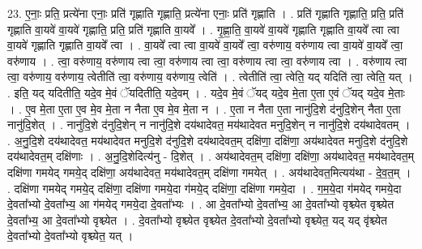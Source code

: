 \documentclass[17pt]{extarticle}
\begin{document}
23. ए॒नाः॒ प्रति॒ प्रत्ये॑ना एनाः॒ प्रति॑ गृह्णाति गृह्णाति॒ प्रत्ये॑ना एनाः॒ प्रति॑ गृह्णाति । . प्रति॑ गृह्णाति गृह्णाति॒ प्रति॒ प्रति॑ गृह्णाति वा॒यवे॑ वा॒यवे॑ गृह्णाति॒ प्रति॒ प्रति॑ गृह्णाति वा॒यवे᳚ । . गृ॒ह्णा॒ति॒ वा॒यवे॑ वा॒यवे॑ गृह्णाति गृह्णाति वा॒यवे᳚ त्वा त्वा वा॒यवे॑ गृह्णाति गृह्णाति वा॒यवे᳚ त्वा । . वा॒यवे᳚ त्वा त्वा वा॒यवे॑ वा॒यवे᳚ त्वा॒ वरु॑णाय॒ वरु॑णाय त्वा वा॒यवे॑ वा॒यवे᳚ त्वा॒ वरु॑णाय । . त्वा॒ वरु॑णाय॒ वरु॑णाय त्वा त्वा॒ वरु॑णाय त्वा त्वा॒ वरु॑णाय त्वा त्वा॒ वरु॑णाय त्वा । . वरु॑णाय त्वा त्वा॒ वरु॑णाय॒ वरु॑णाय॒ त्वेतीति॑ त्वा॒ वरु॑णाय॒ वरु॑णाय॒ त्वेति॑ । . त्वेतीति॑ त्वा॒ त्वेति॒ यद् यदिति॑ त्वा॒ त्वेति॒ यत् । . इति॒ यद् यदितीति॒ यदे॒व मे॒वं ॅयदितीति॒ यदे॒वम् । . यदे॒व मे॒वं ॅयद् यदे॒व मे॒ता ए॒ता ए॒वं ॅयद् यदे॒व मे॒ताः । . ए॒व मे॒ता ए॒ता ए॒व मे॒व मे॒ता न नैता ए॒व मे॒व मे॒ता न । . ए॒ता न नैता ए॒ता नानु॑दि॒शे द॑नुदि॒शेन् नैता ए॒ता नानु॑दि॒शेत् । . नानु॑दि॒शे द॑नुदि॒शेन् न नानु॑दि॒शे दय॑थादेवत॒ मय॑थादेवत मनुदि॒शेन् न नानु॑दि॒शे दय॑थादेवतम् । . अ॒नु॒दि॒शे दय॑थादेवत॒ मय॑थादेवत मनुदि॒शे द॑नुदि॒शे दय॑थादेवत॒म् दक्षि॑णा॒ दक्षि॑णा॒ अय॑थादेवत मनुदि॒शे द॑नुदि॒शे दय॑थादेवत॒म् दक्षि॑णाः । . अ॒नु॒दि॒शेदित्य॑नु - दि॒शेत् । . अय॑थादेवत॒म् दक्षि॑णा॒ दक्षि॑णा॒ अय॑थादेवत॒ मय॑थादेवत॒म् दक्षि॑णा गमयेद् गमये॒द् दक्षि॑णा॒ अय॑थादेवत॒ मय॑थादेवत॒म् दक्षि॑णा गमयेत् । . अय॑थादेवत॒मित्यय॑था - दे॒व॒त॒म् । . दक्षि॑णा गमयेद् गमये॒द् दक्षि॑णा॒ दक्षि॑णा गमये॒दा ग॑मये॒द् दक्षि॑णा॒ दक्षि॑णा गमये॒दा । . ग॒म॒ये॒दा ग॑मयेद् गमये॒दा दे॒वता᳚भ्यो दे॒वता᳚भ्य॒ आ ग॑मयेद् गमये॒दा दे॒वता᳚भ्यः । . आ दे॒वता᳚भ्यो दे॒वता᳚भ्य॒ आ दे॒वता᳚भ्यो वृश्च्येत वृश्च्येत दे॒वता᳚भ्य॒ आ दे॒वता᳚भ्यो वृश्च्येत । . दे॒वता᳚भ्यो वृश्च्येत वृश्च्येत दे॒वता᳚भ्यो दे॒वता᳚भ्यो वृश्च्येत॒ यद् यद् वृ॑श्च्येत दे॒वता᳚भ्यो दे॒वता᳚भ्यो वृश्च्येत॒ यत् । \newline
\end{document}
